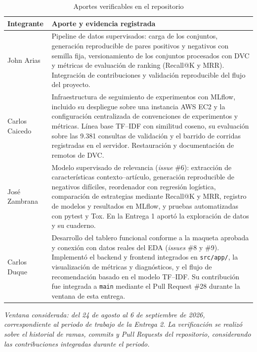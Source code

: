 \documentclass[11pt]{article}
\begin{document}
\begin{table}[h!]
\centering
\caption{Aportes verificables en el repositorio}
\label{tab:equipo}
\small
\begin{tabular}{p{2.9cm} p{11.4cm}}
\toprule
\textbf{Integrante} & \textbf{Aporte y evidencia registrada} \\
\midrule

John Arias &
Pipeline de datos supervisados: carga de los conjuntos, generación reproducible de pares positivos y negativos con semilla fija, versionamiento de los conjuntos procesados con DVC y métricas de evaluación de ranking (Recall@K y MRR). Integración de contribuciones y validación reproducible del flujo del proyecto. \\[3pt]

Carlos Caicedo &
Infraestructura de seguimiento de experimentos con MLflow, incluido su despliegue sobre una instancia AWS EC2 y la configuración centralizada de convenciones de experimentos y métricas. Línea base TF--IDF con similitud coseno, su evaluación sobre las 9.381 consultas de validación y el barrido de corridas registradas en el servidor. Restauración y documentación de remotos de DVC. \\[3pt]

José Zambrana &
Modelo supervisado de relevancia (\textit{issue} \#6): extracción de características contexto--artículo, generación reproducible de negativos difíciles, reordenador con regresión logística, comparación de estrategias mediante Recall@K y MRR, registro de modelos y resultados en MLflow, y pruebas automatizadas con pytest y Tox. En la Entrega 1 aportó la exploración de datos y su cuaderno. \\[3pt]

Carlos Duque &
Desarrollo del tablero funcional conforme a la maqueta aprobada y conexión con datos reales del EDA (\textit{issues} \#8 y \#9). Implementó el backend y frontend integrados en \texttt{src/app/}, la visualización de métricas y diagnósticos, y el flujo de recomendación basado en el modelo TF--IDF. Su contribución fue integrada a \texttt{main} mediante el Pull Request \#28 durante la ventana de esta entrega. \\
\bottomrule
\end{tabular}
\end{table}

\vspace{-4pt}
\noindent\footnotesize\textit{Ventana considerada: del 24 de agosto al 6 de septiembre de 2026, correspondiente al periodo de trabajo de la Entrega 2. La verificación se realizó sobre el historial de ramas, commits y Pull Requests del repositorio, considerando las contribuciones integradas durante el periodo.}\normalsize
\end{document}

